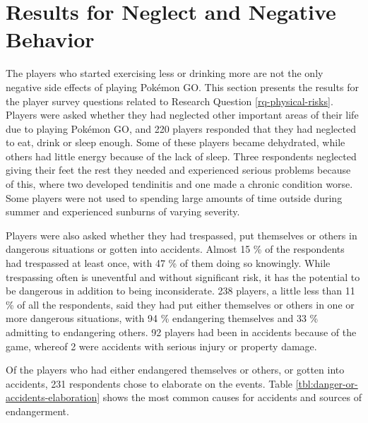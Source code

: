 \section{Results for Neglect and Negative Behavior}

The players who started exercising less or drinking more are not the only negative side effects of playing Pokémon GO. This section presents the results for the player survey questions related to Research Question \ref{rq-physical-risks}. Players were asked whether they had neglected other important areas of their life due to playing Pokémon GO, and 220 players responded that they had neglected to eat, drink or sleep enough. Some of these players became dehydrated, while others had little energy because of the lack of sleep. Three respondents neglected giving their feet the rest they needed and experienced serious problems because of this, where two developed tendinitis and one made a chronic condition worse. Some players were not used to spending large amounts of time outside during summer and experienced sunburns of varying severity.

Players were also asked whether they had trespassed, put themselves or others in dangerous situations or gotten into accidents. Almost 15 \% of the respondents had trespassed at least once, with 47 \% of them doing so knowingly. While trespassing often is uneventful and without significant risk, it has the potential to be dangerous in addition to being inconsiderate. 238 players, a little less than 11 \% of all the respondents, said they had put either themselves or others in one or more dangerous situations, with 94 \% endangering themselves and 33 \% admitting to endangering others. 92 players had been in accidents because of the game, whereof 2 were accidents with serious injury or property damage.

Of the players who had either endangered themselves or others, or gotten into accidents, 231 respondents chose to elaborate on the events. Table \ref{tbl:danger-or-accidents-elaboration} shows the most common causes for accidents and sources of endangerment.

